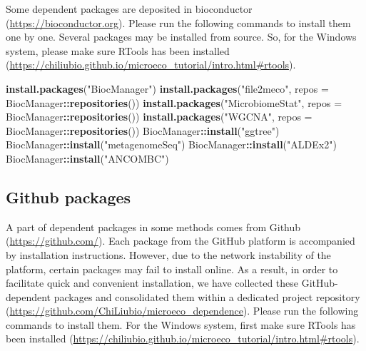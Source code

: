 \documentclass[
]{book}
\newenvironment{Shaded}{\begin{snugshade}}{\end{snugshade}}
\newcommand{\AttributeTok}[1]{\textcolor[rgb]{0.13,0.29,0.53}{#1}}
\newcommand{\FunctionTok}[1]{\textcolor[rgb]{0.13,0.29,0.53}{\textbf{#1}}}
\newcommand{\NormalTok}[1]{#1}
\newcommand{\SpecialCharTok}[1]{\textcolor[rgb]{0.81,0.36,0.00}{\textbf{#1}}}
\newcommand{\StringTok}[1]{\textcolor[rgb]{0.31,0.60,0.02}{#1}}
\begin{document}
Some dependent packages are deposited in bioconductor (\url{https://bioconductor.org}).
Please run the following commands to install them one by one.
Several packages may be installed from source.
So, for the Windows system, please make sure RTools has been installed (\url{https://chiliubio.github.io/microeco_tutorial/intro.html\#rtools}).

\begin{Shaded}
\begin{Highlighting}[]
\FunctionTok{install.packages}\NormalTok{(}\StringTok{"BiocManager"}\NormalTok{)}
\FunctionTok{install.packages}\NormalTok{(}\StringTok{"file2meco"}\NormalTok{, }\AttributeTok{repos =}\NormalTok{ BiocManager}\SpecialCharTok{::}\FunctionTok{repositories}\NormalTok{())}
\FunctionTok{install.packages}\NormalTok{(}\StringTok{"MicrobiomeStat"}\NormalTok{, }\AttributeTok{repos =}\NormalTok{ BiocManager}\SpecialCharTok{::}\FunctionTok{repositories}\NormalTok{())}
\FunctionTok{install.packages}\NormalTok{(}\StringTok{"WGCNA"}\NormalTok{, }\AttributeTok{repos =}\NormalTok{ BiocManager}\SpecialCharTok{::}\FunctionTok{repositories}\NormalTok{())}
\NormalTok{BiocManager}\SpecialCharTok{::}\FunctionTok{install}\NormalTok{(}\StringTok{"ggtree"}\NormalTok{)}
\NormalTok{BiocManager}\SpecialCharTok{::}\FunctionTok{install}\NormalTok{(}\StringTok{"metagenomeSeq"}\NormalTok{)}
\NormalTok{BiocManager}\SpecialCharTok{::}\FunctionTok{install}\NormalTok{(}\StringTok{"ALDEx2"}\NormalTok{)}
\NormalTok{BiocManager}\SpecialCharTok{::}\FunctionTok{install}\NormalTok{(}\StringTok{"ANCOMBC"}\NormalTok{)}
\end{Highlighting}
\end{Shaded}

\subsection{Github packages}\label{github-packages}

A part of dependent packages in some methods comes from Github (\url{https://github.com/}).
Each package from the GitHub platform is accompanied by installation instructions.
However, due to the network instability of the platform, certain packages may fail to install online.
As a result, in order to facilitate quick and convenient installation,
we have collected these GitHub-dependent packages and consolidated them within a dedicated project repository (\url{https://github.com/ChiLiubio/microeco_dependence}).
Please run the following commands to install them.
For the Windows system, first make sure RTools has been installed (\url{https://chiliubio.github.io/microeco_tutorial/intro.html\#rtools}).
\end{document}
